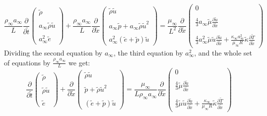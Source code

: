\documentclass[11pt, a4paper]{article}
\newcommand{\parder}[2]{\frac{\partial {#1}}{\partial {#2}}}
\begin{document}
\begin{equation}
    \frac{\rho_\infty a_\infty}{L}\parder{}{\tilde{t}}\begin{pmatrix}
        \tilde{\rho} \\\\
        a_\infty\tilde{\rho}\tilde{u} \\\\
        a_\infty^2\tilde{e}
    \end{pmatrix}+\frac{\rho_\infty a_\infty}{L}\parder{}{\tilde{x}}\begin{pmatrix}
        \tilde{\rho}\tilde{u} \\\\
        a_\infty\tilde{p}+a_\infty\tilde{\rho}\tilde{u}^2 \\\\
        a_\infty^2\left(\tilde{e}+\tilde{p}\right)\tilde{u}
    \end{pmatrix}=\frac{\mu_\infty}{L^2}\parder{}{\tilde{x}}\begin{pmatrix}
        0 \\\\
        \displaystyle\frac{4}{3}a_\infty\tilde{\mu} \parder{\tilde{u}}{\tilde{x}} \\\\
        \displaystyle\frac{4}{3}a_\infty^2\tilde{\mu}\tilde{u}\parder{\tilde{u}}{\tilde{x}}+\frac{\kappa_\infty a_\infty^2}{\mu_\infty R}\tilde{\kappa}\parder{\tilde{T}}{\tilde{x}}
    \end{pmatrix}
\end{equation}
Dividing the second equation by $a_\infty$, the third equation by $a_\infty^2$, and the whole set of equations by $\displaystyle\frac{\rho_\infty a_\infty}{L}$ we get:
\begin{equation}
    \parder{}{\tilde{t}}\begin{pmatrix}
        \tilde{\rho} \\\\
        \tilde{\rho}\tilde{u} \\\\
        \tilde{e}
    \end{pmatrix}+\parder{}{\tilde{x}}\begin{pmatrix}
        \tilde{\rho}\tilde{u} \\\\
        \tilde{p}+\tilde{\rho}\tilde{u}^2 \\\\
        \left(\tilde{e}+\tilde{p}\right)\tilde{u}
    \end{pmatrix}=\frac{\mu_\infty}{L\rho_\infty a_\infty}\parder{}{\tilde{x}}\begin{pmatrix}
        0 \\\\
        \displaystyle\frac{4}{3}\tilde{\mu} \parder{\tilde{u}}{\tilde{x}} \\\\
        \displaystyle\frac{4}{3}\tilde{\mu}\tilde{u}\parder{\tilde{u}}{\tilde{x}}+\frac{\kappa_\infty}{\mu_\infty R}\tilde{\kappa}\parder{\tilde{T}}{\tilde{x}}
    \end{pmatrix}
\end{equation}
\end{document}
